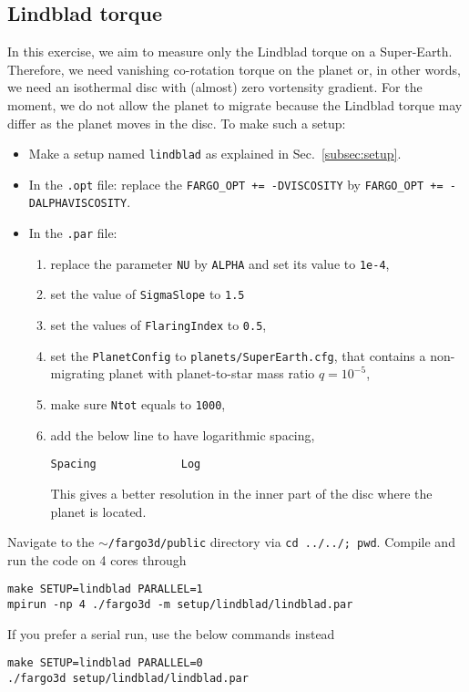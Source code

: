 \documentclass[14pt]{scrartcl}
\begin{document}
\subsection{Lindblad torque} \label{subsec:lindblad}
In this exercise, we aim to measure only the Lindblad torque on a Super-Earth. Therefore, we need vanishing co-rotation torque on the planet or, in other words, we need an isothermal disc with (almost) zero vortensity gradient. For the moment, we do not allow the planet to migrate because the Lindblad torque may differ as the planet moves in the disc. To make such a setup:
\begin{itemize}
	\item Make a setup named \texttt{lindblad} as explained in Sec.~\ref{subsec:setup}.
	\item In the \texttt{.opt} file: replace the \texttt{FARGO\_OPT += -DVISCOSITY}  by \texttt{FARGO\_OPT += -DALPHAVISCOSITY}.
	\item In the \texttt{.par} file:
	\begin{enumerate}
	\item replace the parameter \texttt{NU} by \texttt{ALPHA} and set its value to \texttt{1e-4},
	\item set the value of \texttt{SigmaSlope} to \texttt{1.5}
	\item set the values of \texttt{FlaringIndex} to \texttt{0.5},
	\item set the \texttt{PlanetConfig} to \texttt{planets/SuperEarth.cfg}, that contains a non-migrating planet with planet-to-star mass ratio $q=10^{-5}$,
	\item make sure \texttt{Ntot} equals to \texttt{1000},
	\item add the below line to have logarithmic spacing,
	\begin{verbatim}
Spacing             Log
	\end{verbatim}
	This gives a better resolution in the inner part of the disc where the planet is located.
    \end{enumerate} 
\end{itemize}

Navigate to the \texttt{$\sim$/fargo3d/public} directory via \texttt{cd ../../; pwd}. Compile and run the code on 4 cores through
\begin{verbatim}
make SETUP=lindblad PARALLEL=1
mpirun -np 4 ./fargo3d -m setup/lindblad/lindblad.par
\end{verbatim}
If you prefer a serial run, use the below commands instead
\begin{verbatim}
make SETUP=lindblad PARALLEL=0
./fargo3d setup/lindblad/lindblad.par
\end{verbatim}
\end{document}
